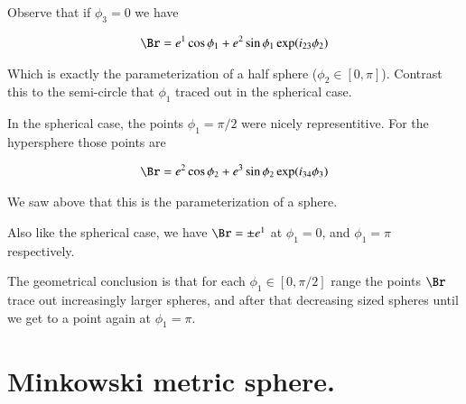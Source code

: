 \documentclass{article}
\begin{document}
\begin{itemize}
Observe that if $\phi_3 = 0$ we have

\begin{align*}
\Br
&= e^1 \cos\phi_1 + e^2 \sin\phi_1 \exp( i_{23} \phi_2 ) \\
\end{align*}

Which is exactly the parameterization of a half sphere ($\phi_2 \in [0,\pi]$).  Contrast this to the semi-circle that $\phi_1$ traced out in the spherical case.  

In the spherical case, the points $\phi_1 = \pi/2$ were nicely representitive.  For the hypersphere those points are

\begin{align*}
\Br &= e^2 \cos\phi_2 + e^3 \sin\phi_2 \exp(i_{34}\phi_3) \\
\end{align*}

We saw above that this is the parameterization of a sphere.

Also like the spherical case, we have $\Br = \pm e^1$ at $\phi_1 = 0$, and $\phi_1 = \pi$ respectively.

The geometrical conclusion is that for each $\phi_1 \in [0,\pi/2]$ range the points $\Br$ trace out increasingly
larger spheres, and after that decreasing sized spheres until we get to a point again at $\phi_1 = \pi$.

\end{itemize}

\section{ Minkowski metric sphere. }



\end{document}
